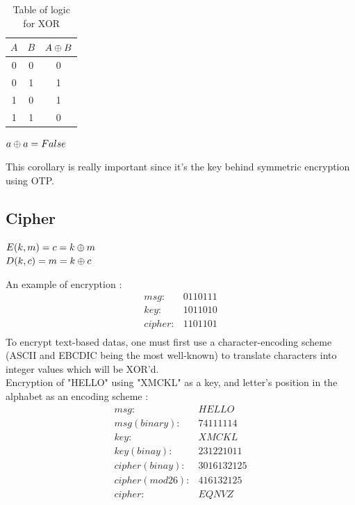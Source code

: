 \begin{table}[ht!]
	\centering
		\begin{tabular}{c|c|c}
			$A$ & $B$ & $A\oplus B$ \\
			\hline
			0 & 0 & 0 \\
			0 & 1 & 1 \\
			1 & 0 & 1 \\
			1 & 1 & 0 \\
			\hline 
		\end{tabular}
	\caption{Table of logic for XOR}
	\label{tab:TableOfLogicForXOR}
\end{table}

\begin{mytheorem}
    $ a \oplus a = False $
\end{mytheorem}
This corollary is really important since it's the key behind symmetric encryption using OTP.

\subsection{Cipher}

\begin{mydef}
\begin{minipage}[t]{0.8\textwidth}
	$ E(k,m) = c = k \oplus m $ \\
	$ D(k,c ) = m = k \oplus c$
\end{minipage}
\end{mydef}

An example of encryption :
\begin{align*}
    msg: & 0 1 1 0 1 1 1      \\
    key: & 1 0 1 1 0 1 0      \\
    cipher: & 1 1 0 1 1 0 1  \\
\end{align*}
To encrypt text-based datas, one must first use a character-encoding scheme (ASCII and  EBCDIC being the most well-known) to translate characters into integer values which will be XOR'd. \\

Encryption of "HELLO" using "XMCKL" as a key, and letter's position in the alphabet as an encoding scheme :
\begin{align*}
    msg: & H E L L O        \\
    msg (binary) : & 7 4 11 11 14 \\
    key: & X M C K L   \\
    key (binay) :& 23 12 2 10 11 \\
    cipher (binay): & 30 16 13 21 25  \\
    cipher (mod 26) : & 4 16 13 21 25 \\
    cipher :& E Q N V Z  \\
\end{align*}

